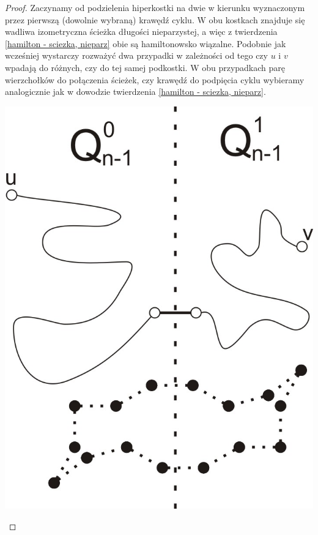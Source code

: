 \documentclass{pracamgr}
\begin{document}
    \begin{proof}
     Zaczynamy od podzielenia hiperkostki na dwie w kierunku wyznaczonym przez pierwszą (dowolnie wybraną) krawędź cyklu.
     W obu kostkach znajduje się wadliwa izometryczna ścieżka długości nieparzystej, a więc z twierdzenia \ref{hamilton - sciezka, nieparz}
     obie są hamiltonowsko wiązalne. Podobnie jak wcześniej wystarczy rozważyć dwa przypadki w zależności od tego czy
     $u$ i $v$ wpadają do różnych, czy do tej samej podkostki. W obu przypadkach parę wierzchołków do połączenia ścieżek, czy krawędź do podpięcia
     cyklu wybieramy analogicznie jak w dowodzie twierdzenia \ref{hamilton - sciezka, nieparz}.
     \begin{center}
      \includegraphics[scale=0.75]{img/Q_hamilton_c1.jpg}\quad\quad\quad\quad

\end{center}
\end{proof}
\end{document}
